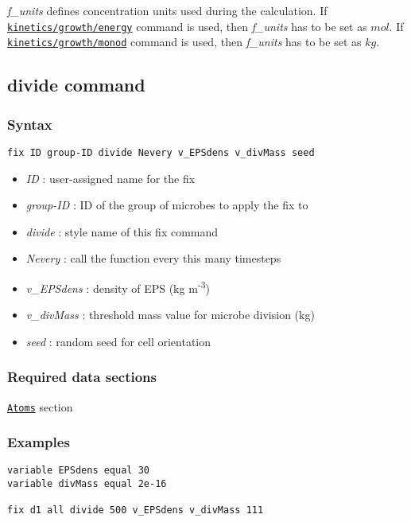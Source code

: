\documentclass[11pt,a4paper,openright]{article}
\begin{document}
{\it f\_units} defines concentration units used during the calculation. 
If \\ \hyperref[fkineticsenergy]{\tt kinetics/growth/energy} command is used, then {\it f\_units} has to be set as $mol$. If \hyperref[fkineticsmonod]{\tt kinetics/growth/monod} command is used, then {\it f\_units} has to be set as $kg$.

\newpage
\subsection{divide command}
\label{divide}
\subsubsection*{Syntax}

\begin{Verbatim}[frame=single]
fix ID group-ID divide Nevery v_EPSdens v_divMass seed
\end{Verbatim}
	
\begin{itemize} [nosep]
\item
	{\it ID }: user-assigned name for the fix
\item
	{\it group-ID }: ID of the group of microbes to apply the fix to
\item
	{\it divide }: style name of this fix command
\item
	{\it Nevery }: call the function every this many timesteps
\item
	{\it v\_EPSdens }: density of EPS (kg m\textsuperscript{-3})
\item
	{\it v\_divMass }: threshold mass value for microbe division (kg)
\item 
	{\it seed }: random seed for cell orientation
\end{itemize}

\subsubsection*{Required data sections} 
\hyperref[satom]{\tt Atoms} section

\subsubsection*{Examples}

\begin{Verbatim}[frame=single]
variable EPSdens equal 30
variable divMass equal 2e-16

fix d1 all divide 500 v_EPSdens v_divMass 111
\end{Verbatim}
\end{document}
